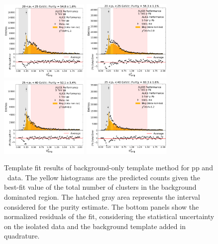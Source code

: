 \begin{figure}[htpb]
\includegraphics[width=0.38\textwidth]{Data_Analysis/Purity/bf-example-pp-cluster_Lambda-20-25.pdf}
\includegraphics[width=0.38\textwidth]{Data_Analysis/Purity/bf-example-p-Pb-cluster_Lambda-20-25.pdf}
\\
\includegraphics[width=0.38\textwidth]{Data_Analysis/Purity/bf-example-pp-cluster_Lambda-25-40.pdf}
\includegraphics[width=0.38\textwidth]{Data_Analysis/Purity/bf-example-p-Pb-cluster_Lambda-25-40.pdf}
\caption{Template fit results of background-only template method for pp and \pPb~data. The yellow histograms are the predicted counts given the best-fit value of the total number of clusters in the background dominated region. The hatched gray area represents the interval considered for the purity estimate. The bottom panels show the normalized residuals of the fit, considering the statistical uncertainty on the isolated data and the background template added in quadrature. }
\label{BkgOnlyFit_pPb}
\end{figure}

